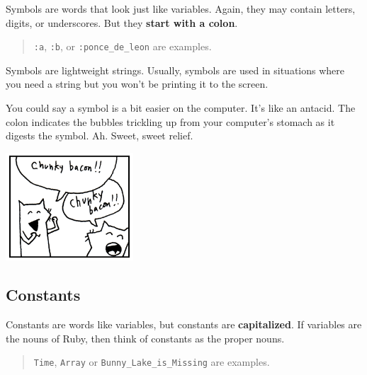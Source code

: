 \documentclass[10pt,twoside]{report}
\begin{document}
Symbols are words that look just like variables.  Again, they may
contain letters, digits, or underscores.  But they {\bf start with a
  colon}.

\begin{quote}
\lstinline[breaklines=true]|:a|, \lstinline[breaklines=true]|:b|, or
\lstinline[breaklines=true]|:ponce_de_leon| are examples.\end{quote}


Symbols are lightweight strings.  Usually, symbols are used in
situations where you need a string but you won't be printing it to the
screen.

You could say a symbol is a bit easier on the computer.  It's like an
antacid.  The colon indicates the bubbles trickling up from your
computer's stomach as it digests the symbol.  Ah.  Sweet, sweet
relief.

	\hspace*{1mm}
	\includegraphics[width=0.3575\textwidth]{cache/10.png}




\subsection{Constants}



Constants are words like variables, but constants are {\bf
  capitalized}.  If variables are the nouns of Ruby, then think of
constants as the proper nouns.

\begin{quote}
\lstinline[breaklines=true]|Time|, \lstinline[breaklines=true]|Array|
or \lstinline[breaklines=true]|Bunny_Lake_is_Missing| are
examples.\end{quote}
\end{document}
